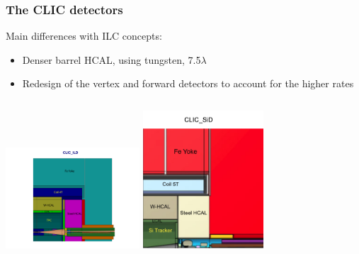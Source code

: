 \documentclass{beamer}
\begin{document}
\begin{frame}
\frametitle{The CLIC detectors}
Main differences with ILC concepts:
\begin{itemize}
  \item Denser barrel HCAL, using tungsten, 7.5$\lambda$
  \item Redesign of the vertex and forward detectors to account for the higher
  rates
\end{itemize}
\begin{columns}[c]
\column{6cm}
\centering
\includegraphics[width=5cm]{CLIC_ILD_xz_box_view1.pdf}
\column{6cm}
\centering
\includegraphics[width=4.5cm]{CLIC_SiD_xz_box_view.pdf}
\end{columns}
\end{frame}
\end{document}
